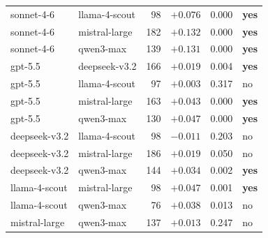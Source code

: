 \begin{table}[t]
\begin{tabular}{llrrrl}
sonnet-4-6     & llama-4-scout  &  98 & $+0.076$ & 0.000 & \textbf{yes} \\
sonnet-4-6     & mistral-large  & 182 & $+0.132$ & 0.000 & \textbf{yes} \\
sonnet-4-6     & qwen3-max      & 139 & $+0.131$ & 0.000 & \textbf{yes} \\
gpt-5.5        & deepseek-v3.2  & 166 & $+0.019$ & 0.004 & \textbf{yes} \\
gpt-5.5        & llama-4-scout  &  97 & $+0.003$ & 0.317 & no \\
gpt-5.5        & mistral-large  & 163 & $+0.043$ & 0.000 & \textbf{yes} \\
gpt-5.5        & qwen3-max      & 130 & $+0.047$ & 0.000 & \textbf{yes} \\
deepseek-v3.2  & llama-4-scout  &  98 & $-0.011$ & 0.203 & no \\
deepseek-v3.2  & mistral-large  & 186 & $+0.019$ & 0.050 & no \\
deepseek-v3.2  & qwen3-max      & 144 & $+0.034$ & 0.002 & \textbf{yes} \\
llama-4-scout  & mistral-large  &  98 & $+0.047$ & 0.001 & \textbf{yes} \\
llama-4-scout  & qwen3-max      &  76 & $+0.038$ & 0.013 & no \\
mistral-large  & qwen3-max      & 137 & $+0.013$ & 0.247 & no \\
\bottomrule
\end{tabular}
\end{table}

